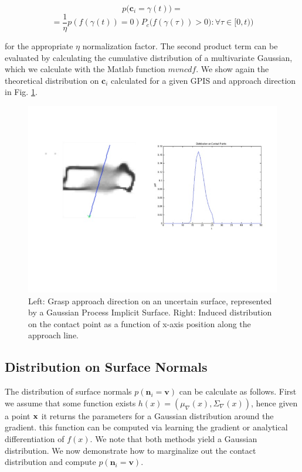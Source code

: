 \documentclass[letterpaper, 10 pt, conference]{ieeeconf}  %
\begin{document}
\[
  p\big(\textbf{c}_i = \gamma(t)\big) = 
\]
\[
  = \frac{1}{\eta} p(f(\gamma(t)) = 0) P_c\big(f(\gamma(\tau)) > 0): \forall \tau \in [0,t)\big)			 
\]

for the appropriate $\eta$ normalization factor.
The second product term can be evaluated by calculating the cumulative distribution of a multivariate Gaussian, which we calculate with the Matlab function $mvncdf$.
We show again the theoretical distribution on $\textbf{c}_i$ calculated for a given GPIS and approach direction in Fig.
\ref{fig:GraspContactPt}.

\begin{figure}[ht!]
\centering
\includegraphics[scale = 0.3]{figures/Slide04.jpg}
\caption{Left: Grasp approach direction on an uncertain surface, represented by a Gaussian Process Implicit Surface.  Right: Induced distribution on the contact point as a function of x-axis position along the approach line.}
\vspace*{-10pt}
\label{fig:GraspContactPt}
\end{figure}

\subsection{Distribution on Surface Normals} 
The distribution of surface normals $p(\textbf{n}_i = \textbf{v})$ can be calculate as follows.
First we assume that some function exists $h(x) = ( \mu_{\nabla}(x), \Sigma_{\nabla}(x) )$, hence given a point $\bf{x}$ it returns the parameters for a Gaussian distribution around the gradient.
this function can be computed via learning the gradient \cite{solak2003derivative} or analytical differentiation of $f(x)$.
We note that both methods yield a Gaussian distribution.
We now demonstrate how to marginalize out the contact distribution and compute $p(\textbf{n}_i = \textbf{v})$.\\
\end{document}
